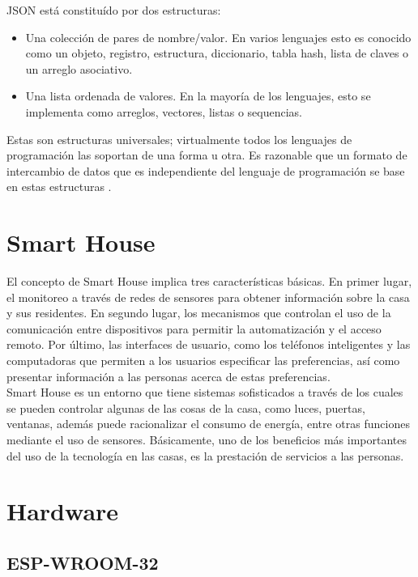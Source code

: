 JSON está constituído por dos estructuras:

\begin{itemize}
	\item Una colección de pares de nombre/valor. En varios lenguajes esto es conocido como un objeto, registro, estructura, diccionario, tabla hash, lista de claves o un arreglo asociativo.
	
	\item Una lista ordenada de valores. En la mayoría de los lenguajes, esto se implementa como arreglos, vectores, listas o sequencias.
\end{itemize}

Estas son estructuras universales; virtualmente todos los lenguajes de programación las soportan de una forma u otra. Es razonable que un formato de intercambio de datos que es independiente del lenguaje de programación se base en estas estructuras \cite{JSON}.

\section{Smart House}

El concepto de Smart House implica tres características básicas. En primer lugar, el monitoreo a través de redes de sensores para obtener información sobre la casa y sus residentes. En segundo lugar, los mecanismos que controlan el uso de la comunicación entre dispositivos para permitir la automatización y el acceso remoto. Por último, las interfaces de usuario, como los teléfonos inteligentes y las computadoras que permiten a los usuarios especificar las preferencias, así como presentar información a las personas acerca de estas preferencias. \\

Smart House es un entorno que tiene sistemas sofisticados a través de los cuales se pueden controlar algunas de las cosas de la casa, como luces, puertas, ventanas, además  puede racionalizar el consumo de energía, entre otras funciones mediante el uso de sensores. Básicamente, uno de los beneficios más importantes del uso de la tecnología en las casas, es la prestación de servicios a las personas.\cite{Howedi2016} 

\section{Hardware}

\subsection{ESP-WROOM-32}

